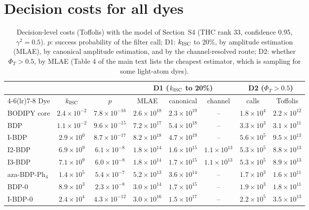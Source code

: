 \section{Decision costs for all dyes}
\begin{table}
  \caption{Decision-level costs (Toffolis) with the model of Section~S4 (THC rank 33, confidence 0.95,
  $\gamma^2=0.5$). $p$: success probability of the filter call; D1: $k_\mathrm{ISC}$ to 20\%, by amplitude estimation
  (MLAE), by canonical amplitude estimation, and by the channel-resolved route; D2: whether $\Phi_T>0.5$, by MLAE (Table 4 of the main text lists the cheapest estimator, which is sampling for some light-atom dyes).}
  \label{tab:alldecision}
  \footnotesize
  \setlength{\tabcolsep}{4pt}
  \begin{tabular}{lccccccc}
    \toprule
    & & & \multicolumn{3}{c}{D1 ($k_\mathrm{ISC}$ to 20\%)} & \multicolumn{2}{c}{D2 ($\Phi_T>0.5$)} \\
    \cmidrule(lr){4-6}\cmidrule(lr){7-8}
    Dye & $k_\mathrm{ISC}$ & $p$ & MLAE & canonical & channel & calls & Toffolis \\
    \midrule
    BODIPY core & $2.4\times10^{-2}$ & $7.8\times10^{-16}$ & $2.6\times10^{18}$ & $2.3\times10^{19}$ & -- & $1.8\times10^{4}$ & $2.2\times10^{12}$ \\
    BDP & $1.1\times10^{-2}$ & $9.6\times10^{-15}$ & $7.2\times10^{17}$ & $5.4\times10^{18}$ & -- & $3.3\times10^{3}$ & $3.1\times10^{11}$ \\
    I-BDP & $2.9\times10^{0}$ & $8.7\times10^{-17}$ & $8.2\times10^{18}$ & $4.7\times10^{19}$ & -- & $5.6\times10^{5}$ & $9.5\times10^{13}$ \\
    I2-BDP & $6.9\times10^{9}$ & $6.1\times10^{-8}$ & $1.8\times10^{14}$ & $1.6\times10^{15}$ & $1.1\times10^{13}$ & $5.3\times10^{5}$ & $8.8\times10^{13}$ \\
    I3-BDP & $7.1\times10^{9}$ & $6.0\times10^{-8}$ & $1.8\times10^{14}$ & $1.7\times10^{15}$ & $1.1\times10^{13}$ & $5.3\times10^{5}$ & $8.9\times10^{13}$ \\
    aza-BDP-Ph$_4$ & $1.4\times10^{5}$ & $5.4\times10^{-7}$ & $5.2\times10^{13}$ & $3.6\times10^{14}$ & -- & $1.7\times10^{3}$ & $1.6\times10^{11}$ \\
    BDP-0 & $8.9\times10^{3}$ & $2.3\times10^{-8}$ & $3.0\times10^{14}$ & $1.7\times10^{15}$ & -- & $1.9\times10^{3}$ & $1.8\times10^{11}$ \\
    I-BDP-0 & $2.4\times10^{4}$ & $4.3\times10^{-12}$ & $3.0\times10^{16}$ & $1.5\times10^{17}$ & -- & $2.2\times10^{5}$ & $3.5\times10^{13}$ \\

\end{tabular}
\end{table}
